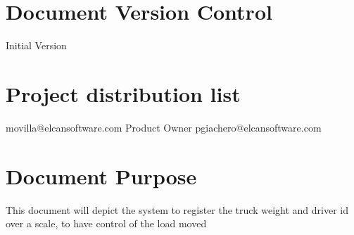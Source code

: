 \section{Document Version Control}
\begin{elcanversions}
	 {Initial Version}
\end{elcanversions}

\section{Project distribution list}

\begin{elcandistribution}

	 {movilla@elcansoftware.com} {\distribdate} 
	 {Product Owner} {pgiachero@elcansoftware.com} {\distribdate}
	
\end{elcandistribution}

\section{Document Purpose}
This document will depict the system to register the truck weight and driver id over a scale, to have control of the load moved

